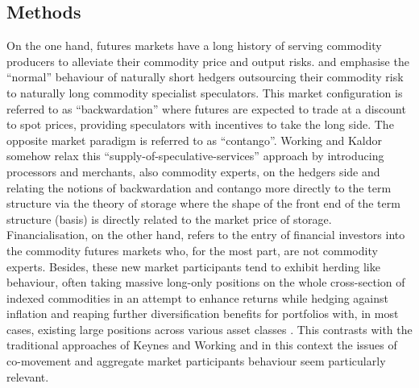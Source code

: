 \documentclass[
  authoryear,
  preprint,
  3p]{elsarticle}
\begin{document}
\subsection{Methods}\label{sec-methods}

On the one hand, futures markets have a long history of serving
commodity producers to alleviate their commodity price and output risks.
\citet{keynes_treatise_1930} and \citet{hicks_value_1939} emphasise the
``normal'' behaviour of naturally short hedgers outsourcing their
commodity risk to naturally long commodity specialist speculators. This
market configuration is referred to as ``backwardation'' where futures
are expected to trade at a discount to spot prices, providing
speculators with incentives to take the long side. The opposite market
paradigm is referred to as ``contango''. Working
\citep{working_price_1933, working_theory_1948, working_hedging_1953}
and Kaldor \citep{kaldor_speculation_1939} somehow relax this
``supply-of-speculative-services'' \citep{till_long_2007} approach by
introducing processors and merchants, also commodity experts, on the
hedgers side and relating the notions of backwardation and contango more
directly to the term structure via the theory of storage where the shape
of the front end of the term structure (basis) is directly related to
the market price of storage.\\
Financialisation, on the other hand, refers to the entry of financial
investors into the commodity futures markets who, for the most part, are
not commodity experts. Besides, these new market participants tend to
exhibit herding like behaviour, often taking massive long-only positions
on the whole cross-section of indexed commodities in an attempt to
enhance returns while hedging against inflation and reaping further
diversification benefits for portfolios with, in most cases, existing
large positions across various asset classes
\citep{brunetti_speculators_2016, boyd_prevalence_2016, cheng_convective_2014, juvenal_speculation_2015, singleton_investor_2013, tang_index_2012}.
This contrasts with the traditional approaches of Keynes and Working and
in this context the issues of co-movement and aggregate market
participants behaviour seem particularly relevant.

\medskip
\end{document}
